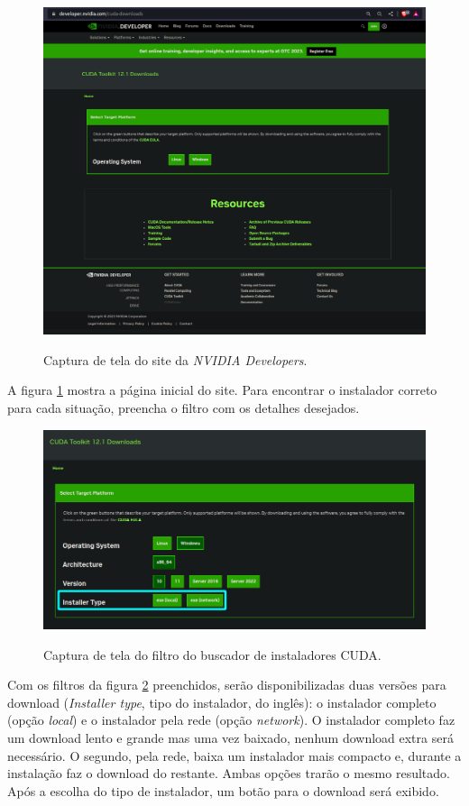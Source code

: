\begin{figure}[H]
    \centering
    \caption{Captura de tela do site da \textit{NVIDIA Developers}.}
    \includegraphics[width=12cm]{fig/cuda_download_page.png}
    \label{fig:fig25}
\end{figure}

A figura \ref{fig:fig25} mostra a página inicial do site. Para encontrar o instalador correto para cada situação, preencha o filtro com os detalhes desejados.

\begin{figure}[H]
    \centering
    \caption{Captura de tela do filtro do buscador de instaladores CUDA.}
    \includegraphics[width=12cm]{fig/cuda_download_page_installer_type.png}
    \label{fig:fig26}
\end{figure}

Com os filtros da figura \ref{fig:fig26} preenchidos, serão disponibilizadas duas versões para download (\textit{Installer type}, tipo do instalador, do inglês): o instalador completo (opção \textit{local}) e o instalador pela rede (opção \textit{network}). O instalador completo faz um download lento e grande mas uma vez baixado, nenhum download extra será necessário. O segundo, pela rede, baixa um instalador mais compacto e, durante a instalação faz o download do restante. Ambas opções trarão o mesmo resultado. Após a escolha do tipo de instalador, um botão para o download será exibido.

